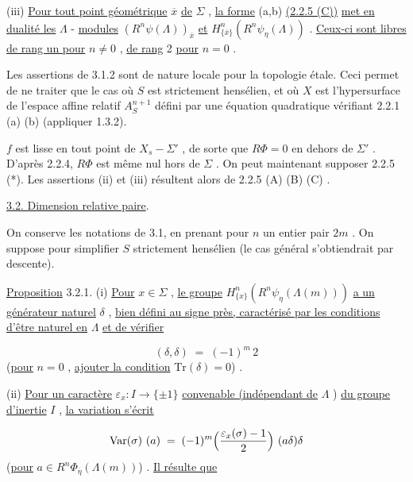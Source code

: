 (iii)  \underline{Pour tout point géométrique} $\overline{x}$ \underline{de} $\Sigma$ , \underline{la forme} (a,b) \underline{(2.2.5 (C))} \underline{met en dualité les} $\Lambda$ - \underline{modules} $(R^{n}\psi(\Lambda))_{\overline{x}}$ \underline{et} $H^{n}_{\{\overline{x}\}}(R^{n}\psi_{\eta}(\Lambda))$ . \underline{Ceux-ci sont libres de rang un pour} $n \neq 0$ , \underline{de rang} 2 \underline{pour} $n = 0$ .

Les assertions de 3.1.2 sont de nature locale pour la topologie étale. Ceci permet de ne traiter que le cas où $S$ est strictement hensélien, et où $X$ est l'hypersurface de l'espace affine relatif $A^{n+1}_{S}$ défini par une équation quadratique vérifiant 2.2.1 (a) (b) (appliquer 1.3.2).

$f$ est lisse en tout point de $X_{s} - \Sigma'$ , de sorte que $R\Phi = 0$ en dehors de $\Sigma'$ . D'après 2.2.4, $R\Phi$ est même nul hors de $\Sigma$ . On peut maintenant supposer 2.2.5 (*). Les assertions (ii) et (iii) résultent alors de 2.2.5 (A) (B) (C) .


\underline{3.2. Dimension relative paire}.

On conserve les notations de 3.1, en prenant pour $n$ un entier pair $2m$ . On suppose pour simplifier $S$ strictement hensélien (le cas général s'obtiendrait par descente).

\underline{Proposition} 3.2.1.  (i) \underline{Pour} $x \in \Sigma$ , \underline{le groupe} $H^{n}_{\{x\}}(R^{n}\psi_{\eta}(\Lambda(m)))$ \underline{a un générateur naturel} $\delta$ , \underline{bien défini au signe près, caractérisé par les conditions d'être naturel en} $\Lambda$ \underline{et de vérifier} 



\begin{equation*}
 (\delta,\delta) \;=\; (-1)^{m}\, 2
\end{equation*}
(\underline{pour} $n = 0$ , \underline{ajouter la condition} $\mathrm{Tr}(\delta) = 0$) .

(ii)  \underline{Pour un caractère} $\varepsilon_{x} : I \longrightarrow \{\pm 1\}$ \underline{convenable (indépendant de} $\Lambda$ ) \underline{du groupe d'inertie} $I$ , \underline{la variation s'écrit}

\begin{equation*}
\mathrm{Var}(\sigma)\ (a) \;=\; (-1)^{m}\Bigl(\frac{\varepsilon_{x}(\sigma)-1}{2}\Bigr)\ (a\delta)\delta
\end{equation*}
(\underline{pour} $a \in R^{n}\Phi_{\overline{\eta}}(\Lambda(m))$) . \underline{Il résulte que}

